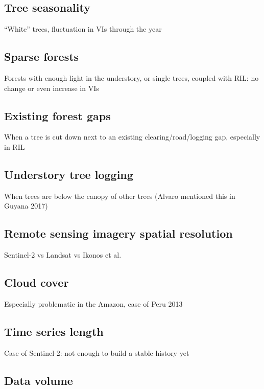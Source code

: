 \documentclass[a4paper,12pt]{scrbook}
\begin{document}
\subsection{Tree seasonality}

``White'' trees, fluctuation in VIs through the year

\subsection{Sparse forests}

Forests with enough light in the understory, or single trees, coupled with \ac{RIL}: no change or even increase in VIs

\subsection{Existing forest gaps}

When a tree is cut down next to an existing clearing/road/logging gap, especially in \ac{RIL}

\subsection{Understory tree logging}

When trees are below the canopy of other trees (Alvaro mentioned this in Guyana 2017)

\subsection{Remote sensing imagery spatial resolution}

Sentinel-2 vs Landsat vs Ikonos et al.

\subsection{Cloud cover}

Especially problematic in the Amazon, case of Peru 2013

\subsection{Time series length}

Case of Sentinel-2: not enough to build a stable history yet

\subsection{Data volume}
\end{document}
